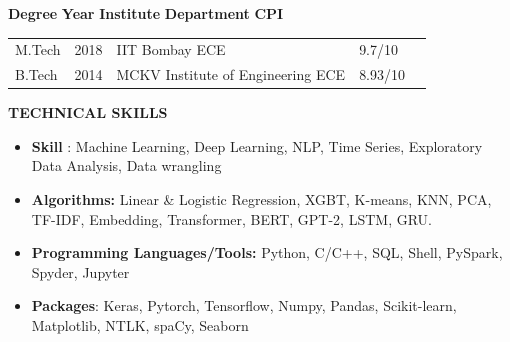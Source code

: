 \documentclass{article}
\begin{document}
 \begin{theorem}
\textbf{Degree}  \hspace{1.2cm} \textbf{Year}  \hspace{1.1 cm} \textbf{Institute} \hspace{3.4 cm} \textbf{Department}   \hspace{1cm}  \textbf{CPI} 
 \end{theorem}
 \vspace{-3mm}
\renewcommand{\tabcolsep}{5mm}
\begin{table}[htb]
\begin{tabular}{lllll}
M.Tech & \hspace{0.4cm} 2018 & \hspace{0.2cm} IIT Bombay \hspace{3.15cm} ECE    & \hspace{1.4cm} 9.7/10   \\
B.Tech      & \hspace{0.4cm} 2014       & \hspace{0.2cm} MCKV Institute of Engineering \hspace{.40cm} ECE & \hspace{1.5cm}8.93/10  
\vspace{-3mm}
\end{tabular}
\end{table}



 \begin{theorem}
   \vspace{-0.7mm}
\begin{center}
\textbf{ TECHNICAL SKILLS
}\end{center}  
\vspace{-0.9mm}    
   \end{theorem}
\vspace{-3 mm}
\begin{itemize}
\item \textbf {Skill} : Machine Learning, Deep Learning, NLP, Time Series, Exploratory Data Analysis, Data wrangling   
\item \textbf{Algorithms:} Linear \& Logistic Regression, XGBT, K-means, KNN, PCA, TF-IDF, Embedding, Transformer, BERT, GPT-2, LSTM, GRU.

 \item \textbf{Programming Languages/Tools:}
 Python, C/C++, SQL, Shell,  PySpark, Spyder, Jupyter
\item \textbf{Packages}: Keras, Pytorch, Tensorflow, Numpy, Pandas, Scikit-learn, Matplotlib, NTLK, spaCy, Seaborn

\end{itemize}
\end{document}
